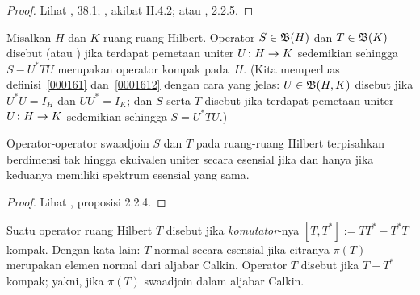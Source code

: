 \begin{proof} Lihat \cite{Conway:2000}, 38.1; \cite{Davidson:1996}, akibat II.4.2; atau
\cite{HigsonR:2000}, 2.2.5. \ns
\end{proof}

\begin{defn} Misalkan $H$ dan $K$ ruang-ruang Hilbert. Operator $S \in \mathfrak{B}(H)$ dan $T \in \mathfrak{B}(K)$ disebut
 (atau
) jika terdapat pemetaan uniter $U\colon H \rightarrow K$ sedemikian sehingga $S - U^*TU$
merupakan operator kompak pada~$H$. (Kita memperluas definisi~\ref{000161} dan~\ref{0001612} dengan
cara yang jelas: $U \in \mathfrak{B}(H,K)$ disebut
 jika $U^*U = I_H$ dan $UU^* = I_K$; dan $S$ serta $T$ disebut
 jika terdapat pemetaan uniter $U\colon H \rightarrow K$ sedemikian sehingga $S =
U^*TU$.)
\end{defn}

\begin{prop}\label{005134} Operator-operator swaadjoin $S$ dan $T$ pada ruang-ruang Hilbert terpisahkan berdimensi tak hingga
ekuivalen uniter secara esensial jika dan hanya jika keduanya memiliki spektrum esensial yang sama.
\end{prop}

\begin{proof} Lihat \cite{HigsonR:2000}, proposisi 2.2.4.  \ns \end{proof}

\begin{defn} Suatu operator ruang Hilbert $T$ disebut
 jika
\emph{komutator}-nya $[T,T^*] := TT^* - T^*T$ kompak. Dengan kata lain: $T$ normal secara
esensial jika citranya $\pi(T)$ merupakan elemen normal dari aljabar Calkin. Operator $T$
disebut
 jika $T - T^*$ kompak; yakni, jika $\pi(T)$
swaadjoin dalam aljabar Calkin.
\end{defn}

